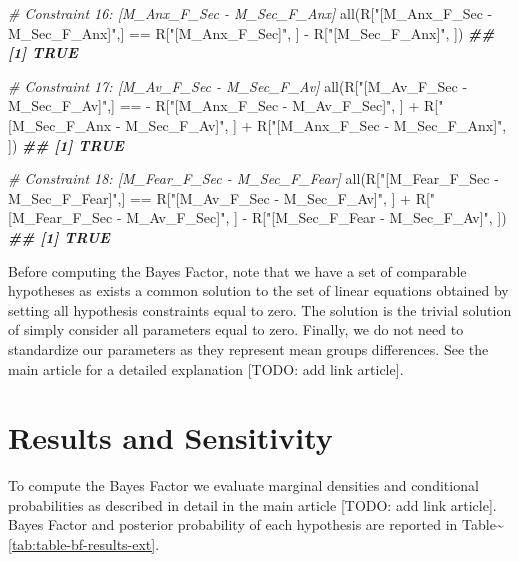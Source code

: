 \documentclass[
]{book}
\newenvironment{Shaded}{\begin{snugshade}}{\end{snugshade}}
\newcommand{\CommentTok}[1]{\textcolor[rgb]{0.56,0.35,0.01}{\textit{#1}}}
\newcommand{\DocumentationTok}[1]{\textcolor[rgb]{0.56,0.35,0.01}{\textbf{\textit{#1}}}}
\newcommand{\FunctionTok}[1]{\textcolor[rgb]{0.00,0.00,0.00}{#1}}
\newcommand{\NormalTok}[1]{#1}
\newcommand{\SpecialCharTok}[1]{\textcolor[rgb]{0.00,0.00,0.00}{#1}}
\newcommand{\StringTok}[1]{\textcolor[rgb]{0.31,0.60,0.02}{#1}}
\begin{document}
\begin{Shaded}
\begin{Highlighting}[]
\CommentTok{\# Constraint 16: [M\_Anx\_F\_Sec {-} M\_Sec\_F\_Anx]}
\FunctionTok{all}\NormalTok{(R[}\StringTok{"[M\_Anx\_F\_Sec {-} M\_Sec\_F\_Anx]"}\NormalTok{,] }\SpecialCharTok{==}\NormalTok{ R[}\StringTok{"[M\_Anx\_F\_Sec]"}\NormalTok{, ] }\SpecialCharTok{{-}}\NormalTok{ R[}\StringTok{"[M\_Sec\_F\_Anx]"}\NormalTok{, ])}
\DocumentationTok{\#\# [1] TRUE}

\CommentTok{\# Constraint 17: [M\_Av\_F\_Sec {-} M\_Sec\_F\_Av]}
\FunctionTok{all}\NormalTok{(R[}\StringTok{"[M\_Av\_F\_Sec {-} M\_Sec\_F\_Av]"}\NormalTok{,] }\SpecialCharTok{==} \SpecialCharTok{{-}}\NormalTok{ R[}\StringTok{"[M\_Anx\_F\_Sec {-} M\_Av\_F\_Sec]"}\NormalTok{, ] }\SpecialCharTok{+}\NormalTok{ R[}\StringTok{"[M\_Sec\_F\_Anx {-} M\_Sec\_F\_Av]"}\NormalTok{, ] }\SpecialCharTok{+}\NormalTok{  R[}\StringTok{"[M\_Anx\_F\_Sec {-} M\_Sec\_F\_Anx]"}\NormalTok{, ])}
\DocumentationTok{\#\# [1] TRUE}

\CommentTok{\# Constraint 18: [M\_Fear\_F\_Sec {-} M\_Sec\_F\_Fear] }
\FunctionTok{all}\NormalTok{(R[}\StringTok{"[M\_Fear\_F\_Sec {-} M\_Sec\_F\_Fear]"}\NormalTok{,] }\SpecialCharTok{==}\NormalTok{ R[}\StringTok{"[M\_Av\_F\_Sec {-} M\_Sec\_F\_Av]"}\NormalTok{, ] }\SpecialCharTok{+}\NormalTok{ R[}\StringTok{"[M\_Fear\_F\_Sec {-} M\_Av\_F\_Sec]"}\NormalTok{, ] }\SpecialCharTok{{-}}\NormalTok{ R[}\StringTok{"[M\_Sec\_F\_Fear {-} M\_Sec\_F\_Av]"}\NormalTok{, ])}
\DocumentationTok{\#\# [1] TRUE}
\end{Highlighting}
\end{Shaded}

Before computing the Bayes Factor, note that we have a set of comparable hypotheses as exists a common solution to the set of linear equations obtained by setting all hypothesis constraints equal to zero. The solution is the trivial solution of simply consider all parameters equal to zero. Finally, we do not need to standardize our parameters as they represent mean groups differences. See the main article for a detailed explanation {[}TODO: add link article{]}.

\hypertarget{results-and-sensitivity}{%
\section{Results and Sensitivity}\label{results-and-sensitivity}}

To compute the Bayes Factor we evaluate marginal densities and conditional probabilities as described in detail in the main article {[}TODO: add link article{]}. Bayes Factor and posterior probability of each hypothesis are reported in Table\textasciitilde\ref{tab:table-bf-results-ext}.
\end{document}
